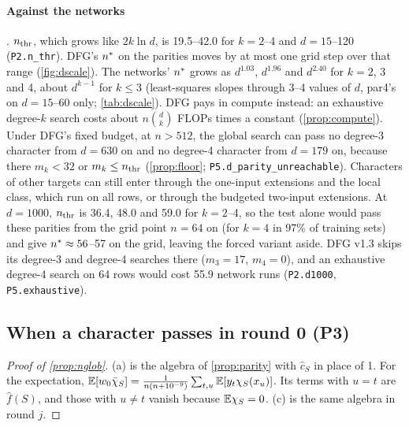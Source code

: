 \paragraph{Against the networks} . $n_{\rm thr}$, which grows like $2k\ln d$, is 19.5--42.0 for $k=2$--4 and $d=15$--120 (\texttt{P2.n\_thr}). DFG's $n^{*}$ on the parities moves by at most one grid step over that range (\cref{fig:dscale}). The networks' $n^{*}$ grows as $d^{1.03}$, $d^{1.96}$ and $d^{2.40}$ for $k=2$, 3 and 4, about $d^{k-1}$ for $k\le3$ (least-squares slopes through 3--4 values of $d$, par4's on $d=15$--60 only; \cref{tab:dscale}). DFG pays in compute instead: an exhaustive degree-$k$ search costs about $n\binom dk$ FLOPs times a constant (\cref{prop:compute}). Under DFG's fixed budget, at $n>512$, the global search can pass no degree-3 character from $d=630$ on and no degree-4 character from $d=179$ on, because there $m_k<32$ or $m_k\le n_{\rm thr}$ (\cref{prop:floor}; \texttt{P5.d\_parity\_unreachable}). Characters of other targets can still enter through the one-input extensions and the local class, which run on all rows, or through the budgeted two-input extensions.  At $d=1000$, $n_{\rm thr}$ is 36.4, 48.0 and 59.0 for $k=2$--4, so the test alone would pass these parities from the grid point $n=64$ on (for $k=4$ in 97\% of training sets) and give $n^{*}\approx56$--57 on the grid, leaving the forced variant aside. DFG v1.3 skips its degree-3 and degree-4 searches there ($m_3=17$, $m_4=0$), and an exhaustive degree-4 search on 64 rows would cost 55.9 network runs (\texttt{P2.d1000}, \texttt{P5.exhaustive}).

\subsection{When a character passes in round 0 (P3)}\label{app:proof-nglob}

\begin{proof}[Proof of \cref{prop:nglob}]
(a) is the algebra of \cref{prop:parity} with $\hat c_S$ in place of 1. For the expectation, $\mathbb{E}[w_0\bar\chi_S]=\frac1{n(n+10^{-9})}\sum_{t,u}\mathbb{E}[y_t\chi_S(x_u)]$. Its terms with $u=t$ are $\hat f(S)$, and those with $u\ne t$ vanish because $\mathbb{E}\chi_S=0$. (c) is the same algebra in round $j$.
\end{proof}

